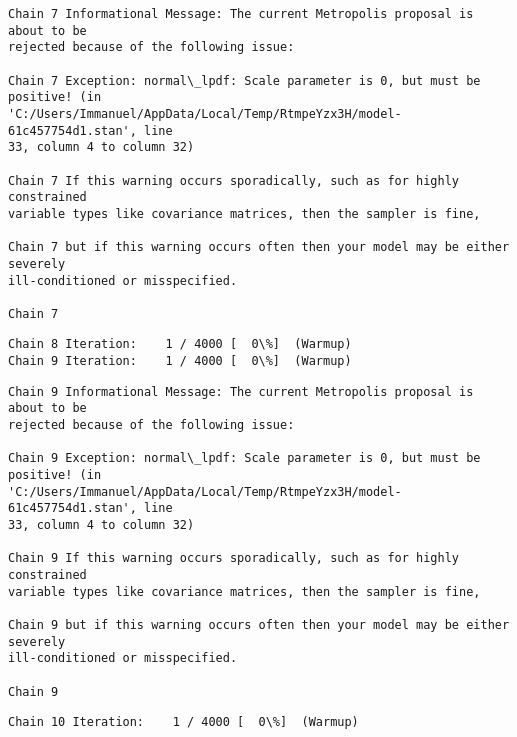 \documentclass[11pt]{article}
\begin{document}
    \begin{Verbatim}[commandchars=\\\{\}]
Chain 7 Informational Message: The current Metropolis proposal is about to be
rejected because of the following issue:

Chain 7 Exception: normal\_lpdf: Scale parameter is 0, but must be positive! (in
'C:/Users/Immanuel/AppData/Local/Temp/RtmpeYzx3H/model-61c457754d1.stan', line
33, column 4 to column 32)

Chain 7 If this warning occurs sporadically, such as for highly constrained
variable types like covariance matrices, then the sampler is fine,

Chain 7 but if this warning occurs often then your model may be either severely
ill-conditioned or misspecified.

Chain 7

    \end{Verbatim}

    \begin{Verbatim}[commandchars=\\\{\}]
Chain 8 Iteration:    1 / 4000 [  0\%]  (Warmup)
Chain 9 Iteration:    1 / 4000 [  0\%]  (Warmup)
    \end{Verbatim}

    \begin{Verbatim}[commandchars=\\\{\}]
Chain 9 Informational Message: The current Metropolis proposal is about to be
rejected because of the following issue:

Chain 9 Exception: normal\_lpdf: Scale parameter is 0, but must be positive! (in
'C:/Users/Immanuel/AppData/Local/Temp/RtmpeYzx3H/model-61c457754d1.stan', line
33, column 4 to column 32)

Chain 9 If this warning occurs sporadically, such as for highly constrained
variable types like covariance matrices, then the sampler is fine,

Chain 9 but if this warning occurs often then your model may be either severely
ill-conditioned or misspecified.

Chain 9

    \end{Verbatim}

    \begin{Verbatim}[commandchars=\\\{\}]
Chain 10 Iteration:    1 / 4000 [  0\%]  (Warmup)
    \end{Verbatim}
\end{document}
